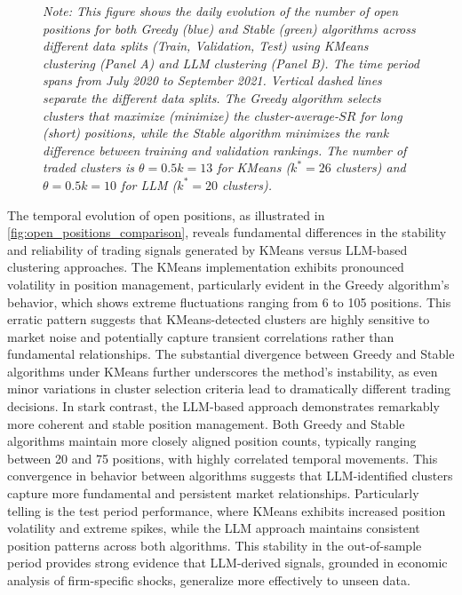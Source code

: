 \begin{figure}[htbp]
\vspace{0.2cm}
\begin{minipage}{\textwidth}
\setlength{\parindent}{0pt}
{\footnotesize\textit{Note: 
This figure shows the daily evolution of the number of open positions for both Greedy (blue) and Stable (green) algorithms across different data splits (Train, Validation, Test) using KMeans clustering (Panel A) and LLM clustering (Panel B). The time period spans from July 2020 to September 2021. Vertical dashed lines separate the different data splits. The Greedy algorithm selects clusters that maximize (minimize) the cluster-average-$SR$ for long (short) positions, while the Stable algorithm minimizes the rank difference between training and validation rankings. The number of traded clusters is $\theta = 0.5k=13$ for KMeans ($k^*=26$ clusters) and $\theta = 0.5k=10$ for LLM ($k^*=20$ clusters).
}}
\end{minipage}
\end{figure}

The temporal evolution of open positions, as illustrated in \cref{fig:open_positions_comparison},  reveals fundamental differences in the stability and reliability of trading signals generated by KMeans versus LLM-based clustering approaches. The KMeans implementation exhibits pronounced volatility in position management, particularly evident in the Greedy algorithm's behavior, which shows extreme fluctuations ranging from 6 to 105 positions. This erratic pattern suggests that KMeans-detected clusters are highly sensitive to market noise and potentially capture transient correlations rather than fundamental relationships. The substantial divergence between Greedy and Stable algorithms under KMeans further underscores the method's instability, as even minor variations in cluster selection criteria lead to dramatically different trading decisions.
%
In stark contrast, the LLM-based approach demonstrates remarkably more coherent and stable position management. Both Greedy and Stable algorithms maintain more closely aligned position counts, typically ranging between 20 and 75 positions, with highly correlated temporal movements. This convergence in behavior between algorithms suggests that LLM-identified clusters capture more fundamental and persistent market relationships. Particularly telling is the test period performance, where KMeans exhibits increased position volatility and extreme spikes, while the LLM approach maintains consistent position patterns across both algorithms. This stability in the out-of-sample period provides strong evidence that LLM-derived signals, grounded in economic analysis of firm-specific shocks, generalize more effectively to unseen data.

